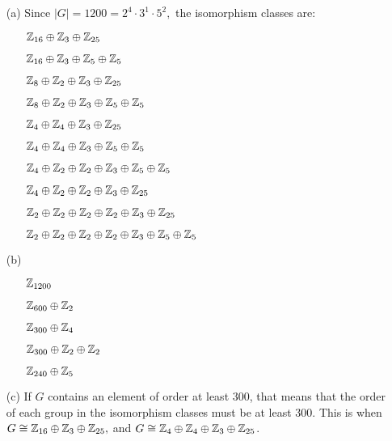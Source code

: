 \documentclass[titlepage]{article}
\begin{document}
\begin{solution}
\begin{itemize}
\vspace{-5mm}
\item[(a)] Since $|G| =1200 = 2^4 \cdot 3^1 \cdot 5^2,$ the isomorphism classes are: 
\begin{itemize}
\item[\cdot] $\mathbb{Z}_{16} \oplus \mathbb{Z}_3 \oplus \mathbb{Z}_{25}$
\item[\cdot] $\mathbb{Z}_{16} \oplus \mathbb{Z}_3 \oplus \mathbb{Z}_5 \oplus \mathbb{Z}_5$
\item[\cdot] $\mathbb{Z}_{8} \oplus \mathbb{Z}_2 \oplus \mathbb{Z}_3 \oplus \mathbb{Z}_{25}$
\item[\cdot] $\mathbb{Z}_8 \oplus \mathbb{Z}_2 \oplus \mathbb{Z}_3 \oplus \mathbb{Z}_5 \oplus \mathbb{Z}_5$
\item[\cdot] $\mathbb{Z}_4 \oplus \mathbb{Z}_4 \oplus \mathbb{Z}_3 \oplus \mathbb{Z}_{25}$
\item[\cdot] $\mathbb{Z}_4 \oplus \mathbb{Z}_4 \oplus \mathbb{Z}_3 \oplus \mathbb{Z}_5 \oplus \mathbb{Z}_5$
\item[\cdot] $\mathbb{Z}_4 \oplus \mathbb{Z}_2 \oplus \mathbb{Z}_2 \oplus \mathbb{Z}_3 \oplus \mathbb{Z}_5 \oplus \mathbb{Z}_5$
\item[\cdot] $\mathbb{Z}_4 \oplus \mathbb{Z}_2 \oplus \mathbb{Z}_2 \oplus \mathbb{Z}_3 \oplus \mathbb{Z}_{25}$
\item[\cdot] $\mathbb{Z}_2 \oplus \mathbb{Z}_2 \oplus  \mathbb{Z}_2 \oplus \mathbb{Z}_2 \oplus \mathbb{Z}_3 \oplus \mathbb{Z}_{25}$
\item[\cdot] $\mathbb{Z}_2 \oplus \mathbb{Z}_2 \oplus  \mathbb{Z}_2 \oplus \mathbb{Z}_2 \oplus \mathbb{Z}_3 \oplus \mathbb{Z}_5 \oplus \mathbb{Z}_5$
\end{itemize}
\item[(b)]
\begin{itemize}
\item[\cdot] $\mathbb{Z}_{1200}$
\item[\cdot] $\mathbb{Z}_{600} \oplus \mathbb{Z}_2$
\item[\cdot] $\mathbb{Z}_{300} \oplus \mathbb{Z}_4$
\item[\cdot] $\mathbb{Z}_{300} \oplus \mathbb{Z}_2 \oplus \mathbb{Z}_2$
\item[\cdot] $\mathbb{Z}_{240} \oplus \mathbb{Z}_5$
\end{itemize}
\item[(c)] If $G$ contains an element of order at least 300, that means that the order of each group in the isomorphism classes must be at least 300. This is when $G \cong \mathbb{Z}_{16} \oplus \mathbb{Z}_3 \oplus \mathbb{Z}_{25},$ and $G \cong \mathbb{Z}_4 \oplus \mathbb{Z}_4 \oplus \mathbb{Z}_3 \oplus \mathbb{Z}_{25}$.
\end{itemize}
\end{solution}
\end{document}
